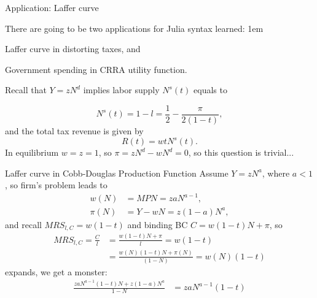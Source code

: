 \documentclass[11pt,aspectratio=43,usenames,dvipsnames]{beamer}
\let\oldenumerate=\enumerate
\let\endoldenumerate=\endenumerate
\renewenvironment{enumerate}{\oldenumerate \itemsep1em}{ \endoldenumerate}
\theoremstyle{definition}
\begin{document}
\begin{frame}{Application: Laffer curve}
\label{slide:Application__Laffer_curve}

There are going to be two applications for Julia syntax learned:
\begin{enumerate}
    \item Laffer curve in distorting taxes, and
    \item Government spending in CRRA utility function.
\end{enumerate}

Recall that $ Y = z N^{d} $ implies labor supply $ N^{s}(t) $ equals to

%
\begin{equation}
\label{eq:laborSupplyTaxRate}
    N^{s}(t) = 1 - l = \frac{1}{2} - \frac{\pi}{2(1-t)}
,\end{equation}
%
and the total tax revenue is given by
%
\begin{equation}
\label{eq:govTaxRevenue}
    R(t) = w t N^{s}(t)
.\end{equation}
%
In equilibrium $ w = z = 1 $, so $ \pi = z N^{d} - w N^{d} = 0 $, so this question is trivial...

\end{frame}

\begin{frame}{Laffer curve in Cobb-Douglas Production Function}
\label{slide:Laffer_curve_in_Cobb_Douglas_Production_Function}
Assume $ Y = z N^{a} $, where $ a < 1 $, so firm's problem leads to
%
\begin{align}
    w(N)
        & = MPN = z a N^{a-1},
    \\
    \pi(N)
        & = Y - wN = z (1-a) N^{a},
\end{align}
%
and recall $ MRS_{l, C} = w(1-t) $ and binding BC $ C = w(1-t)N + \pi $, so
%
\begin{align}
    MRS_{l, C} = \frac{C}{l}
        & = \frac{w (1-t) N + \pi}{l} = w(1-t)
    \\
        & = \frac{w(N) (1-t) N + \pi(N)}{(1-N)} = w(N)(1-t)
\end{align}
%
expands, we get a monster:
%
\begin{equation}
    \begin{split}
        \frac{z a N^{a-1}(1-t)N + z (1-a) N^{a}}{ 1-N}
            & = z a N^{a-1} (1-t)
        \\
    \end{split}
\end{equation}
%
\end{frame}
\end{document}
